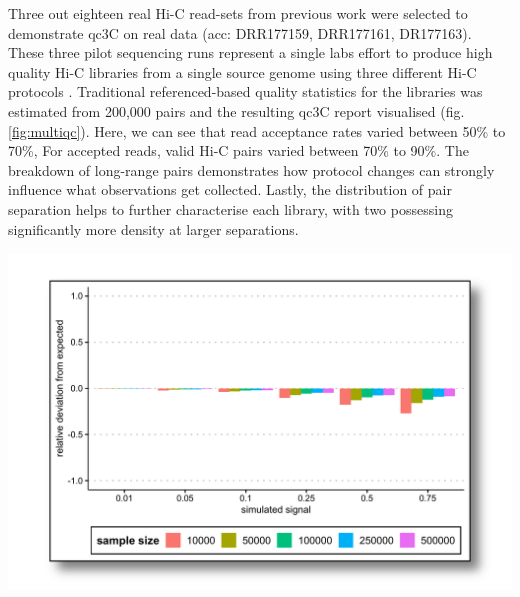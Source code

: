 \documentclass[a0,landscape]{a0poster}
\begin{document}
\begin{multicols}{4}
Three out eighteen real Hi-C read-sets from previous work \cite{Kadota2020-wd} were selected to demonstrate qc3C on real data (acc: DRR177159, DRR177161, DR177163). These three pilot sequencing runs represent a single labs effort to produce high quality Hi-C libraries from a single source genome using three different Hi-C protocols \cite{Kadota2020-wd}. Traditional referenced-based quality statistics for the libraries was estimated from 200,000 pairs and the resulting qc3C report visualised (fig. \ref{fig:multiqc}). Here, we can see that read acceptance rates varied between 50\% to 70\%, For accepted reads, valid Hi-C pairs varied between 70\% to 90\%. The breakdown of long-range pairs demonstrates how protocol changes can strongly influence what observations get collected. Lastly, the distribution of pair separation helps to further characterise each library, with two possessing significantly more density at larger separations.

\begin{minipage}{\linewidth}
\begin{center}\vspace{1cm}
\includegraphics[width=0.85\linewidth]{simulation-plot.pdf}
\label{fig:simulation}
\end{center}\vspace{1cm}
\end{minipage}


\end{multicols}
\end{document}

